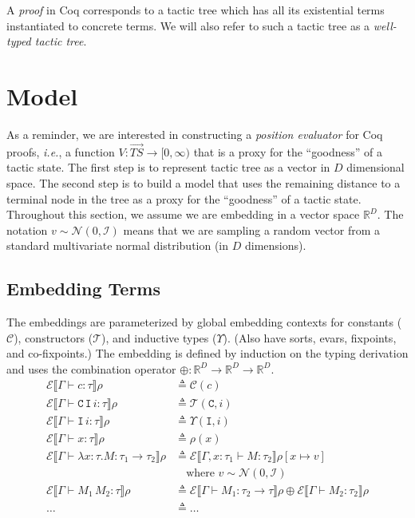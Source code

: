 \documentclass{article}
\newcommand\ie{\textit{i.e.}}
\newcommand{\R}{\mathbb{R}}
\newcommand\mC{\mathcal{C}}
\newcommand\mE{\mathcal{E}}
\newcommand\mI{\mathcal{I}}
\newcommand\mN{\mathcal{N}}
\newcommand\mT{\mathcal{T}}
\newcommand{\eqdef}[0]{\triangleq}
\newcommand\typ{\tau}
\newcommand\ctx{\Gamma}
\newcommand\const{\mC}
\newcommand\conid{\mT}
\newcommand\ind{\Upsilon}
\newcommand\denote[1]{\llbracket#1\rrbracket}
\newcommand\env{\rho}
\newcommand\embedenv[1]{\mE\denote{#1}\env}
\newcommand\combine{\oplus}
\begin{document}
A \emph{proof} in Coq corresponds to a tactic tree which has all its
existential terms instantiated to concrete terms. We will also refer
to such a tactic tree as a \emph{well-typed tactic tree}.


\section{Model}

As a reminder, we are interested in constructing a \emph{position
  evaluator} for Coq proofs, \ie, a function $V: \vec{TS} \rightarrow
[0, \infty)$ that is a proxy for the ``goodness'' of a tactic
  state. The first step is to represent tactic tree as a vector in $D$
  dimensional space. The second step is to build a model that uses the
  remaining distance to a terminal node in the tree as a proxy for the
  ``goodness'' of a tactic state. Throughout this section, we assume
  we are embedding in a vector space $\R^D$. The notation $v \sim
  \mN(0, \mI)$ means that we are sampling a random vector from a
  standard multivariate normal distribution (in $D$ dimensions).


\subsection{Embedding Terms}

The embeddings are parameterized by global embedding contexts for
constants ($\const$), constructors ($\conid$), and inductive types
($\ind$). (Also have sorts, evars, fixpoints, and co-fixpoints.) The
embedding is defined by induction on the typing derivation and uses
the combination operator $\combine: \R^D \rightarrow \R^D \rightarrow \R^D$.
\begin{align*}
  \embedenv{\ctx \vdash c: \typ} & \eqdef \const(c) \\
  \embedenv{\ctx \vdash \texttt{C} \, \texttt{I} \, i: \typ} & \eqdef \conid(\texttt{C}, i) \\
  \embedenv{\ctx \vdash \texttt{I} \, i: \typ} & \eqdef \ind(\texttt{I}, i) \\
  \embedenv{\ctx \vdash x: \typ} & \eqdef \env(x) \\
  \embedenv{\ctx \vdash \lambda x: \typ. M: \typ_1 \rightarrow \typ_2} & \eqdef \embedenv{\ctx, x: \typ_1 \vdash M: \typ_2}[x \mapsto v] \\
  & \quad \mbox{where $v \sim \mN(0, \mI)$} \\
  \embedenv{\ctx \vdash M_1 \, M_2: \typ} & \eqdef \embedenv{\ctx \vdash M_1: \typ_2 \rightarrow \typ} \combine \embedenv{\ctx \vdash M_2: \typ_2} \\
  \dots & \eqdef \dots
\end{align*}
\end{document}
